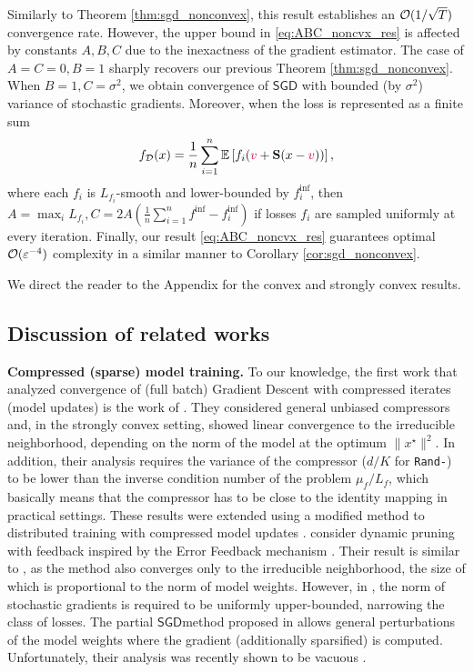 \documentclass{article}
\newcommand\br[1]{\left ( #1 \right )}
\newcommand{\rnd}[1]{{\texttt{Rand-}}#1}
\newcommand{\shift}{{\color{purple}s}}
\newcommand{\SGD}{$\mathsf{SGD}$}
\newcommand{\bb}{\mathbb}
\newcommand{\cO}{{\cal O}}
\newcommand{\Exp}[1]{{\bb E}\left[#1\right]}
\theoremstyle{plain}
\newcommand{\tf}{f_{\mathcal{D}}}
\renewcommand{\shift}{{\color{purple}v}}
\newcommand{\mS}{{\bf S}}
\theoremstyle{plain}
\theoremstyle{definition}
\theoremstyle{remark}
\begin{document}
Similarly to Theorem \ref{thm:sgd_nonconvex}, this result establishes an $\cO(1/\sqrt{T})$ convergence rate. However, the upper bound in \eqref{eq:ABC_noncvx_res} is affected by constants $A, B, C$ due to the inexactness of the gradient estimator. The case of $A = C = 0, B = 1$ sharply recovers our previous Theorem \ref{thm:sgd_nonconvex}. When $B = 1, C = \sigma^2$, we obtain convergence of \SGD\text{ } with bounded (by $\sigma^2$) variance of stochastic gradients. Moreover, when the loss is represented as a finite sum
\begin{equation} \label{eq:sketch_fin_sum}
	\tf (x) = \frac{1}{n} \sum\limits_{i=1}^n \Exp{f_{i}(\shift + \mS(x - \shift))},
\end{equation}
where each $f_i$ is $L_{f_i}$-smooth and lower-bounded by $f_i^{\inf}$, then $A = \max_i L_{f_i}, C = 2A \br{\frac{1}{n} \sum_{i=1}^n f^{\inf} - f_i^{\inf}}$ if losses $f_i$ are sampled uniformly at every iteration.
Finally, our result \eqref{eq:ABC_noncvx_res} guarantees optimal $\cO(\varepsilon^{-4})$ complexity in a similar manner to Corollary \ref{cor:sgd_nonconvex}.

We direct the reader to the Appendix for the convex and strongly convex results.

\subsection{Discussion of related works}

\textbf{Compressed (sparse) model training.}
To our knowledge, the first work that analyzed convergence of (full batch) Gradient Descent with compressed iterates (model updates) is the work of \citet{khaled2019gradient}. They considered general unbiased compressors and, in the strongly convex setting, showed linear convergence to the irreducible neighborhood, depending on the norm of the model at the optimum $\|x^\star\|^2$. In addition, their analysis requires the variance of the compressor ($d/K$ for \rnd{}) to be lower than the inverse condition number of the problem $\mu_f/L_f$, which basically means that the compressor has to be close to the identity mapping in practical settings. These results were extended using a modified method to distributed training with compressed model updates \citep{chraibi2019distributed, shulgin2022shifted}. \citet{lin2019dynamic} consider dynamic pruning with feedback inspired by the Error Feedback mechanism \citep{Seide2014, Alistarh-EF-NIPS2018, stich2019error}. Their result is similar to \citep{khaled2019gradient}, as the method also converges only to the irreducible neighborhood, the size of which is proportional to the norm of model weights. However, in \citep{lin2019dynamic}, the norm of stochastic gradients is required to be uniformly upper-bounded, narrowing the class of losses. The partial \SGD\text{ }method proposed in \citep{mohtashami2022masked} allows general perturbations of the model weights where the gradient (additionally sparsified) is computed. Unfortunately, their analysis \citep{wang2022progfed} was recently shown to be vacuous \citep{szlendak2023understanding}.
\end{document}
